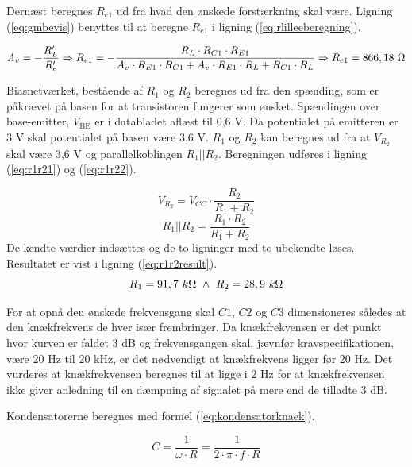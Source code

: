 Dernæst beregnes $R_{e1}$ ud fra hvad den ønskede forstærkning skal være. Ligning (\ref{eq:gmbevis}) benyttes til at beregne $R_{e1}$ i ligning (\ref{eq:rlilleeberegning}).

\begin{equation}
\label{eq:rlilleeberegning}
A_v = -\frac{R'_L}{R'_e} \Rightarrow  R_{e1} =-\frac{R_L \cdot R_{C1} \cdot R_{E1}}{A_v \cdot R_{E1} \cdot R_{C1} + A_v \cdot R_{E1} \cdot R_L + R_{C1} \cdot R_L} \Rightarrow R_{e1} = 866,18~\ohm
\end{equation}

Biasnetværket, bestående af $R_1$ og $R_2$ beregnes ud fra den spænding, som er påkrævet på basen for at transistoren fungerer som ønsket. Spændingen over base-emitter, $V_{\mathrm{BE}}$ er i databladet aflæst til 0,6 V. Da potentialet på emitteren er 3 V skal potentialet på basen være 3,6 V. $R_1$ og $R_2$ kan beregnes ud fra at $V_{R_2}$ skal være 3,6 V og parallelkoblingen $R_1||R_2$. Beregningen udføres i ligning (\ref{eq:r1r21}) og (\ref{eq:r1r22}).

\begin{equation}
V_{R_2} = V_{CC} \cdot \frac{R_2}{R_1+R_2} 
\label{eq:r1r21}
\end{equation}
\begin{equation}
R_1||R_2 = \frac{R_1 \cdot R_2}{R_1 + R_2}
\label{eq:r1r22}
\end{equation}
De kendte værdier indsættes og de to ligninger med to ubekendte løses. Resultatet er vist i ligning (\ref{eq:r1r2result}).
\begin{equation}
R_1 = 91,7~k\ohm ~ \wedge ~ R_2=28,9~k\ohm
\label{eq:r1r2result}
\end{equation}

For at opnå den ønskede frekvensgang skal $C1$, $C2$ og $C3$ dimensioneres således at den knækfrekvens de hver især frembringer. Da knækfrekvensen er det punkt hvor kurven er faldet 3 dB og frekvensgangen skal, jævnfør kravspecifikationen, være 20 Hz til 20 kHz, er det nødvendigt at knækfrekvens  ligger før 20 Hz. Det vurderes at knækfrekvensen beregnes til at ligge i 2 Hz for at knækfrekvensen ikke giver anledning til en dæmpning af signalet på mere end de tilladte 3 dB.

Kondensatorerne beregnes med formel (\ref{eq:kondensatorknaek}).

\begin{equation}
C=\frac{1}{\omega \cdot R}=\frac{1}{2\cdot \pi \cdot f \cdot R}
\label{eq:kondensatorknaek}
\end{equation}


